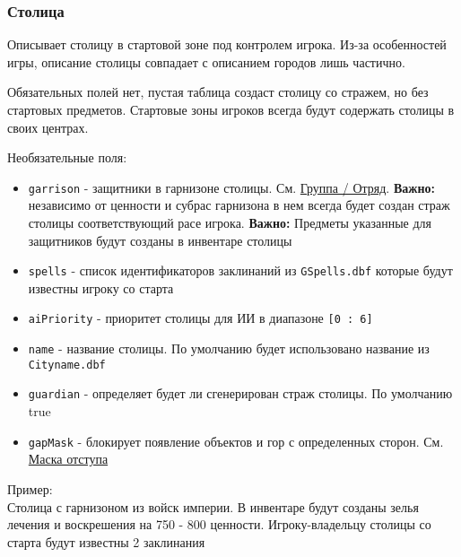 \subsubsection{Столица}
\label{capital}
Описывает столицу в стартовой зоне под контролем игрока. Из-за особенностей игры, описание столицы совпадает с описанием городов лишь частично.

Обязательных полей нет, пустая таблица создаст столицу со стражем, но без стартовых предметов. Стартовые зоны игроков всегда будут содержать столицы в своих центрах.

Необязательные поля:
\begin{itemize}
\item \texttt{garrison} - защитники в гарнизоне столицы. См. \hyperref[group]{Группа / Отряд}. \textbf{Важно:} независимо от ценности и субрас гарнизона в нем всегда будет создан страж столицы соответствующий расе игрока. \textbf{Важно:} Предметы указанные для защитников будут созданы в инвентаре столицы
\item \texttt{spells} - список идентификаторов заклинаний из \texttt{GSpells.dbf} которые будут известны игроку со старта
\item \texttt{aiPriority} - приоритет столицы для ИИ в диапазоне \texttt{[0 : 6]}
\item \texttt{name} - название столицы. По умолчанию будет использовано название из \texttt{Cityname.dbf}
\item \texttt{guardian} - определяет будет ли сгенерирован страж столицы. По умолчанию true
\item \texttt{gapMask} - блокирует появление объектов и гор с определенных сторон. См. \hyperref[gapMask]{Маска отступа}
\end{itemize}

Пример:\\
Столица с гарнизоном из войск империи.
В инвентаре будут созданы зелья лечения и воскрешения на 750 - 800 ценности.
Игроку-владельцу столицы со старта будут известны 2 заклинания

\begin{figure}[H]

\end{figure}